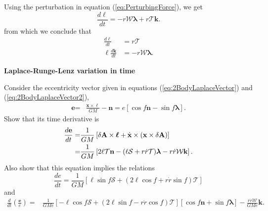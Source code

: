 Using the perturbation in equation (\ref{eq:PerturbingForce}), we get
\begin{equation}
\frac{d\boldsymbol{ \ell}}{dt} = - r\mathcal{W} \boldsymbol{\lambda}  + r\mathcal{T} \textbf{k}.
\end{equation}
from which we conclude that
\begin{subequations}
\begin{align}
\frac{d\ell}{dt} &= r \mathcal{T}\\
\ell \frac{d \textbf{k}}{dt} &= - r\mathcal{W} \boldsymbol{\lambda}.
\end{align}
\end{subequations}

\begin{exercise}
\textbf{Laplace-Runge-Lenz variation in time}

Consider the eccentricity vector given in equations (\ref{eq:2BodyLaplaceVector}) and (\ref{eq:2BodyLaplaceVector2}),
\begin{align}
\textbf{e} = &\frac{\dot{\textbf{x}}\times \boldsymbol{\ell}}{GM} - \textbf{n} = e \left[ \cos f \textbf{n} - \sin f \boldsymbol{\lambda} \right]. 
\end{align}
Show that its time derivative is 
\begin{align}
\frac{d \textbf{e}}{dt} = &\frac{1}{GM}\left[ \delta \textbf{A} \times \boldsymbol{\ell} + \dot{\textbf{x}} \times (\textbf{x} \times \delta \textbf{A}) \right] \notag \\
= &\frac{1}{GM}\left[ 2\ell \mathcal{T} \textbf{n} - (\ell \mathcal{S} + r \dot{r} \mathcal{T}) \boldsymbol{\lambda} - r\dot{r} \mathcal{W} \textbf{k} \right].
\end{align}
Also show that this equation implies the relations
\begin{equation}
\frac{de}{dt} = \frac{1}{GM}\left[ \ell \sin f \mathcal{S} + \left( 2 \ell \cos f + r \dot{r} \sin f \right)\mathcal{T} \right]
\end{equation}
and
\begin{align}
\frac{d}{dt}\left( \frac{\textbf{e}}{e}\right) = &\frac{1}{GMe}\left[ -\ell \cos f \mathcal{S} + \left( 2 \ell \sin f - r \dot{r} \cos f \right)\mathcal{T} \right] \left[ \cos f \textbf{n} + \sin f \boldsymbol{\lambda}\right] - \frac{r \dot{r} \mathcal{W}}{GMe} \textbf{k}.
\end{align}
\end{exercise}

